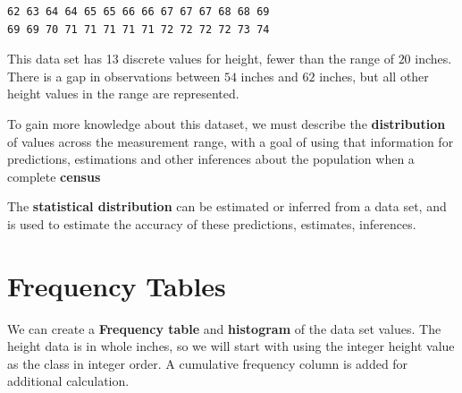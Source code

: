 \documentclass[nohyper,justified]{tufte-handout}\usepackage[]{graphicx}\usepackage[]{color}
\makeatletter
\newenvironment{kframe}{%
 \def\at@end@of@kframe{}%
 \ifinner\ifhmode%
  \def\at@end@of@kframe{\end{minipage}}%
  \begin{minipage}{\columnwidth}%
 \fi\fi%
 \def\FrameCommand##1{\hskip\@totalleftmargin \hskip-\fboxsep
 \colorbox{shadecolor}{##1}\hskip-\fboxsep
     \hskip-\linewidth \hskip-\@totalleftmargin \hskip\columnwidth}%
 \MakeFramed {\advance\hsize-\width
   \@totalleftmargin\z@ \linewidth\hsize
   \@setminipage}}%
 {\par\unskip\endMakeFramed%
 \at@end@of@kframe}
\newenvironment{knitrout}{}{} %
\makeatother
\begin{document}
\begin{knitrout}
\color{fgcolor}\begin{kframe}
\begin{verbatim}
62 63 64 64 65 65 66 66 67 67 67 68 68 69
69 69 70 71 71 71 71 71 72 72 72 72 73 74
\end{verbatim}
\end{kframe}
\end{knitrout}

This data set has 13 discrete values for height, fewer than the range of $20$ inches. There is a gap in observations between $54$ inches and $62$ inches, but all other height values in the range are represented.

To gain more knowledge about this dataset, we must describe the \textbf{distribution} of values across the measurement range, with a goal of using that information for predictions, estimations and other inferences about the population when a complete \textbf{census} 

The \textbf{statistical distribution} can be estimated or inferred from a data set, and 
is used to estimate the accuracy of these predictions, estimates, inferences.

\section{Frequency Tables}
We can create a \textbf{Frequency table} and \textbf{histogram} of the data set values. The height data is in whole inches, so we will start with using the integer height value as the class in integer order. A cumulative frequency column is added for additional calculation.
\end{document}
